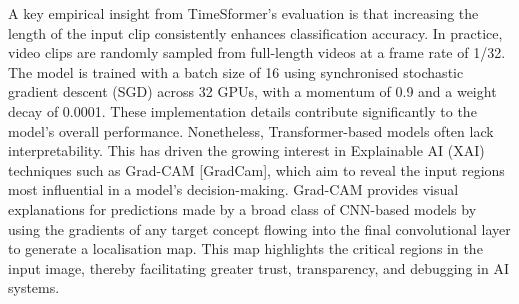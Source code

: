 \documentclass[conference]{IEEEtran}
\begin{document}
A key empirical insight from TimeSformer’s evaluation is that increasing the length of the input clip consistently enhances classification accuracy. In practice, video clips are randomly sampled from full-length videos at a frame rate of 1/32. The model is trained with a batch size of 16 using synchronised stochastic gradient descent (SGD) across 32 GPUs, with a momentum of 0.9 and a weight decay of 0.0001. These implementation details contribute significantly to the model’s overall performance.
Nonetheless, Transformer-based models often lack interpretability. This has driven the growing interest in Explainable AI (XAI) techniques such as Grad-CAM [GradCam], which aim to reveal the input regions most influential in a model’s decision-making. Grad-CAM provides visual explanations for predictions made by a broad class of CNN-based models by using the gradients of any target concept flowing into the final convolutional layer to generate a localisation map. This map highlights the critical regions in the input image, thereby facilitating greater trust, transparency, and debugging in AI systems.
\end{document}
